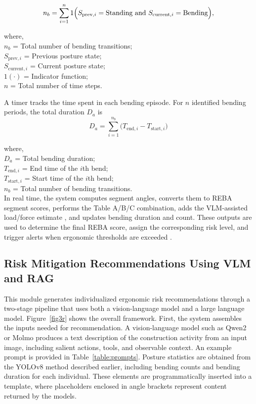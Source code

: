 \documentclass[11pt]{article}
\begin{document}
\begin{equation}
    n_b = \sum_{i=1}^{n} 
    1\Bigl(S_{\text{prev}, i} = \text{Standing}   \ \text{and}\  S_{\text{current}, i} = \text{Bending}\Bigr),
\end{equation}

\noindent where,\\
$n_b$ = Total number of bending transitions;\\
$S_{\text{prev}, i}$ = Previous posture state;\\
$S_{\text{current}, i}$ = Current posture state;\\
$1(\cdot)$ = Indicator function;\\
$n$ = Total number of time steps.

A timer tracks the time spent in each bending episode. For $n$ identified bending periods, the total duration \(D_a\) is
\begin{equation}
    D_a = \sum_{i=1}^{n_b} \bigl(T_{\text{end}, i} - T_{\text{start}, i}\bigr)
\end{equation}

\noindent where,\\
$D_a$ = Total bending duration;\\
$T_{\text{end}, i}$ = End time of the  $i$th bend; \\
$T_{\text{start}, i}$ = Start time of the $i$th bend; \\
$n_b$ = Total number of bending transitions.\\

In real time, the system     computes segment angles, converts them to REBA segment scores, performs the Table A/B/C combination, adds the VLM-assisted load/force estimate ,  and updates bending duration and count. These     outputs   are used to     determine the final REBA score, assign the corresponding risk level, and trigger alerts when ergonomic thresholds are exceeded .
 

\subsection{Risk Mitigation Recommendations Using VLM and RAG}
This module generates individualized ergonomic risk recommendations through a two-stage pipeline that uses both a vision-language model and a large language model. Figure~\ref{fig3r} shows the overall framework. First, the system assembles the inputs needed for recommendation. A vision-language model such as Qwen2 or Molmo \citep{deitke2024molmo} produces a text description of the construction activity from an input image, including salient actions, tools, and observable context. An example prompt is provided in Table~\ref{table:prompts}. Posture statistics are obtained from the YOLOv8 method described earlier, including bending counts and bending duration for each individual. These elements are programmatically inserted into a template, where placeholders enclosed in angle brackets represent content returned by the models.
\end{document}
